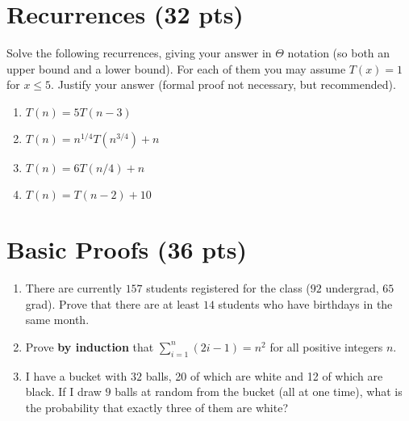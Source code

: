 \documentclass[11pt]{article}
\begin{document}
\section{Recurrences (32 pts)}

Solve the following recurrences, giving your answer in $\Theta$ notation (so both an upper bound and a lower bound).  For each of them you may assume $T(x) = 1$ for $x \leq 5$.   Justify your answer (formal proof not necessary, but recommended).

\begin{enumerate}
\item $T(n) = 5 T(n-3)$

\item $T(n) = n^{1/4} T(n^{3/4}) + n$

\item $T(n) = 6 T(n/4) + n$

\item $T(n) = T(n-2) + 10$

\end{enumerate}


\section{Basic Proofs (36 pts)}
\begin{enumerate}
\item There are currently $157$ students registered for the class ($92$ undergrad, $65$ grad).  Prove that there are at least $14$ students who have birthdays in the same month.

\item Prove \textbf{by induction} that $\sum_{i=1}^n (2i-1) = n^2$ for all positive integers $n$.

\item I have a bucket with $32$ balls, 20 of which are white and 12 of which are black.  If I draw $9$ balls at random from the bucket (all at one time), what is the probability that exactly three of them are white?

\end{enumerate}
\end{document}
